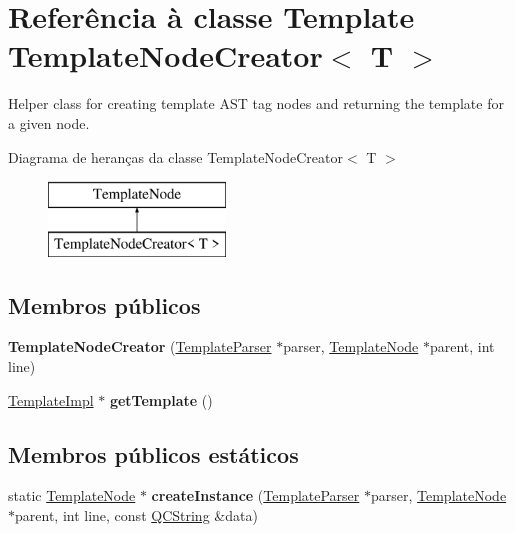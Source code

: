 \hypertarget{class_template_node_creator}{\section{Referência à classe Template Template\-Node\-Creator$<$ T $>$}
\label{class_template_node_creator}
}


Helper class for creating template A\-S\-T tag nodes and returning the template for a given node.  


Diagrama de heranças da classe Template\-Node\-Creator$<$ T $>$\begin{figure}[H]
\begin{center}
\leavevmode
\includegraphics[height=2.000000cm]{class_template_node_creator}
\end{center}
\end{figure}
\subsection*{Membros públicos}
\begin{DoxyCompactItemize}
\item 
\hypertarget{class_template_node_creator_a5a9a8e37f27c67a8640b128ef72f4798}{{\bfseries Template\-Node\-Creator} (\hyperlink{class_template_parser}{Template\-Parser} $\ast$parser, \hyperlink{class_template_node}{Template\-Node} $\ast$parent, int line)}\label{class_template_node_creator_a5a9a8e37f27c67a8640b128ef72f4798}

\item 
\hypertarget{class_template_node_creator_af2a6677d9f13a3db872299b237f245a0}{\hyperlink{class_template_impl}{Template\-Impl} $\ast$ {\bfseries get\-Template} ()}\label{class_template_node_creator_af2a6677d9f13a3db872299b237f245a0}

\end{DoxyCompactItemize}
\subsection*{Membros públicos estáticos}
\begin{DoxyCompactItemize}
\item 
\hypertarget{class_template_node_creator_ad77b8ae2b30656ac107cb6dee454b444}{static \hyperlink{class_template_node}{Template\-Node} $\ast$ {\bfseries create\-Instance} (\hyperlink{class_template_parser}{Template\-Parser} $\ast$parser, \hyperlink{class_template_node}{Template\-Node} $\ast$parent, int line, const \hyperlink{class_q_c_string}{Q\-C\-String} \&data)}\label{class_template_node_creator_ad77b8ae2b30656ac107cb6dee454b444}

\end{DoxyCompactItemize}
